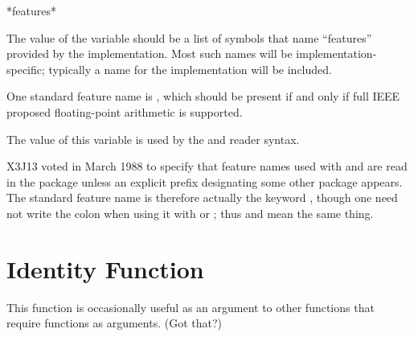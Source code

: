 \begin{defun}[Variable]
*features*

The value of the variable  should be a list of symbols
that name ``features'' provided by the implementation.
Most such names will be implementation-specific; typically
a name for the implementation will be included.

\begin{obsolete}
One standard feature name is , which should
be present if and only if full {IEEE} proposed floating-point
arithmetic \cite{IEEE-PROPOSED-FLOATING-POINT-STANDARD} is supported.
\end{obsolete}

The value of this variable is used by the \cd{\#+} and \cd{\#-}
reader syntax.

\begin{newer}
X3J13 voted in March 1988 
to specify that feature names used with \cd{\#+} and \cd{\#-}
are read in the  package unless an explicit prefix
designating some other package appears.  The standard
feature name  is therefore actually the
keyword , though one need not write the colon
when using it with \cd{\#+} or \cd{\#-}; thus 
and  mean the same thing.
\end{newer}
\end{defun}


\section{Identity Function}

This function is occasionally useful as an argument to
other functions that require functions as arguments.  (Got that?)

